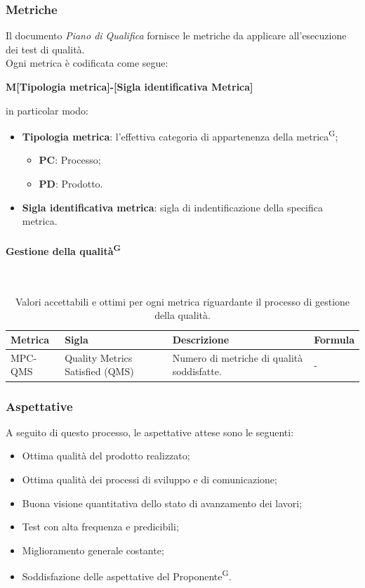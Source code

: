 \documentclass[8pt]{article}
\newcommand{\glossterm}[1]{#1\textsuperscript{G}} %
\newcommand{\subsubsubsection}[1]{\paragraph{#1}\mbox{}\\}
\begin{document}
\subsubsection{Metriche}
Il documento \textit{Piano di Qualifica} fornisce le metriche da applicare all'esecuzione dei test di qualità.
\\Ogni metrica è codificata come segue:
\begin{center}
    \textbf{M[Tipologia metrica]-[Sigla identificativa Metrica]}
\end{center}
in particolar modo:
\begin{itemize}
	\item\textbf{Tipologia metrica}: l'effettiva categoria di appartenenza della
      \glossterm{metrica};
	\begin{itemize}
    \item \textbf{PC}: Processo;
		\item \textbf{PD}: Prodotto.
	\end{itemize}
	\item\textbf{Sigla identificativa metrica}: sigla di indentificazione della specifica metrica.
\end{itemize}
\clearpage
\subsubsubsection{Gestione della \glossterm{qualità}} \label{sec:gestione_qualita}
\begin{table}[H]	
	\centering
	\begin{tabular}{p{2cm} p{3cm} p{6cm} p{4cm}}
		\toprule
		\textbf{Metrica}& \textbf{Sigla} & \textbf{Descrizione} & \textbf{Formula} \\
		\midrule
		MPC-QMS & Quality Metrics Satisfied (QMS) & Numero di metriche di qualità soddisfatte. & - \\
		\bottomrule
	\end{tabular}
	\caption{Valori accettabili e ottimi per ogni metrica riguardante il processo di gestione della qualità.}
	\label{table:Valori accettabili e ottimi per ogni metrica riguardante il processo di gestione della qualità.}
\end{table}

\subsubsection{Aspettative}
A seguito di questo processo, le aspettative attese sono le seguenti:
\begin{itemize}
    \item Ottima qualità del prodotto realizzato;
    \item Ottima qualità dei processi di sviluppo e di comunicazione;
    \item Buona visione quantitativa dello stato di avanzamento dei lavori;
    \item Test con alta frequenza e predicibili;
    \item Miglioramento generale costante;
    \item Soddisfazione delle aspettative del \glossterm{Proponente}.
\end{itemize}
\clearpage
\end{document}
